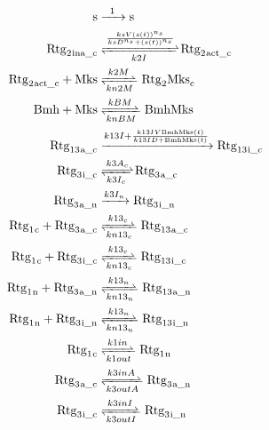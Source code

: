 \documentclass[12pt]{article}
\begin{document}
\begin{align}


\ce{ s &->[1] s}\\
\ce{ Rtg2_{ina\_c} &<=>[\frac{ksV \left( s\left( t \right) \right)^{n_{s}}}{ksD^{n_{s}} + \left( s\left( t \right) \right)^{n_{s}}}][k2I] Rtg2_{act\_c}}\\
\ce{ Rtg2_{act\_c} + Mks &<=>[k2M][kn2M] Rtg2Mks_{c}}\\
\ce{ Bmh + Mks &<=>[kBM][knBM] BmhMks}\\
\ce{ Rtg13_{a\_c} &->[k13I + \frac{k13IV \mathrm{BmhMks}\left( t \right)}{k13ID + \mathrm{BmhMks}\left( t \right)}] Rtg13_{i\_c}}\\
\ce{ Rtg3_{i\_c} &<=>[k3A_{c}][k3I_{c}] Rtg3_{a\_c}}\\
\ce{ Rtg3_{a\_n} &->[k3I_{n}] Rtg3_{i\_n}}\\
\ce{ Rtg1_{c} + Rtg3_{a\_c} &<=>[k13_{c}][kn13_{c}] Rtg13_{a\_c}}\\
\ce{ Rtg1_{c} + Rtg3_{i\_c} &<=>[k13_{c}][kn13_{c}] Rtg13_{i\_c}}\\
\ce{ Rtg1_{n} + Rtg3_{a\_n} &<=>[k13_{n}][kn13_{n}] Rtg13_{a\_n}}\\
\ce{ Rtg1_{n} + Rtg3_{i\_n} &<=>[k13_{n}][kn13_{n}] Rtg13_{i\_n}}\\
\ce{ Rtg1_{c} &<=>[k1in][k1out] Rtg1_{n}}\\
\ce{ Rtg3_{a\_c} &<=>[k3inA][k3outA] Rtg3_{a\_n}}\\
\ce{ Rtg3_{i\_c} &<=>[k3inI][k3outI] Rtg3_{i\_n}}
\end{align}
\end{document}

